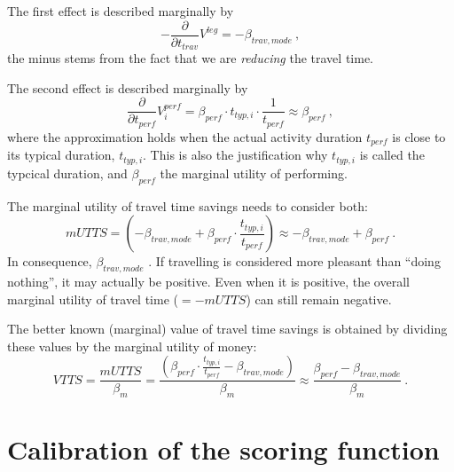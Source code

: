 The first effect is described marginally by
\[
- \frac{\partial}{\partial t_{trav}} V^{leg} = - \beta_{trav,mode} \ ,
\]
the minus stems from the fact that we are \emph{reducing} the travel time.

The second effect is described marginally by
\[
\frac{\partial}{\partial t_{perf}} V^{perf}_i
%
= \beta_{perf} \cdot t_{typ,i} \cdot \frac{1}{t_{perf}}
%
\approx \beta_{perf} \ ,
\]
where the approximation holds when the actual activity duration $t_{perf}$ is close to its typical duration, $t_{typ,i}$.  This is also the justification why $t_{typ,i}$ is called the typcical duration, and $\beta_{perf}$ the marginal utility of performing.

The marginal utility of travel time savings needs to consider both:
\[
mUTTS 
%
= \left( - \beta_{trav,mode} + \beta_{perf} \cdot \frac{t_{typ,i}}{t_{perf}} \right)
%
\approx - \beta_{trav,mode} + \beta_{perf} \ .
\]
In consequence, $\beta_{trav,mode}$ .  If travelling is considered more pleasant than ``doing nothing'', it may actually be positive.  Even when it is positive, the overall marginal utility of travel time ($= -mUTTS$) can still remain negative.

The better known (marginal) value of travel time savings is obtained by dividing these values by the marginal utility of money:
\[
VTTS = \frac{mUTTS}{\beta_m} 
%
= \frac{\left( \beta_{perf} \cdot \frac{t_{typ,i}}{t_{perf}} - \beta_{trav,mode} \right)}{\beta_m}
%
\approx \frac{\beta_{perf} - \beta_{trav,mode}}{\beta_m} \ .
\]



\section{Calibration of the scoring function}

\label{sec:quickstart-kn}

